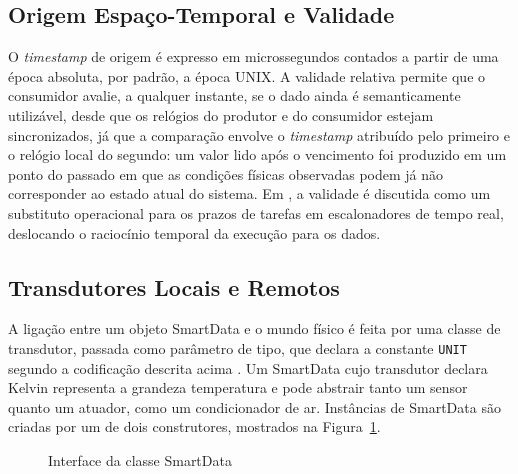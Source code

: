 \documentclass[
    12pt,
    oneside,
    a4paper,
    chapter=TITLE,
    section=TITLE,
    english,
    brazil
]{abntex2}
\begin{document}
\subsection{Origem Espaço-Temporal e Validade}
O \textit{timestamp} de origem é expresso em microssegundos contados a
partir de uma época absoluta, por padrão, a época UNIX. A validade
relativa permite que o consumidor avalie, a qualquer instante, se o dado
ainda é semanticamente utilizável, desde que os relógios do produtor e do
consumidor estejam sincronizados, já que a comparação envolve o
\textit{timestamp} atribuído pelo primeiro e o relógio local do segundo:
um valor lido após o vencimento foi
produzido em um ponto do passado em que as condições físicas observadas
podem já não corresponder ao estado atual do sistema. Em
, a validade é discutida como um
substituto operacional para os prazos de tarefas em escalonadores de tempo
real, deslocando o raciocínio temporal da execução para os dados.

\subsection{Transdutores Locais e Remotos}
\label{sec:sd-transdutores}
A ligação entre um objeto SmartData e o mundo físico é feita por uma
classe de transdutor, passada como parâmetro de tipo, que declara a
constante \texttt{UNIT} segundo a codificação descrita acima
\cite{frohlich2018smartdata}. Um SmartData cujo transdutor declara Kelvin
representa a grandeza temperatura e pode abstrair tanto um sensor quanto
um atuador, como um condicionador de ar. Instâncias de SmartData são
criadas por um de dois construtores, mostrados na
Figura~\ref{fig:sd-classe}.

\begin{figure}[H]
  \centering
  \caption{Interface da classe SmartData}
  \label{fig:sd-classe}
\end{figure}
\end{document}
